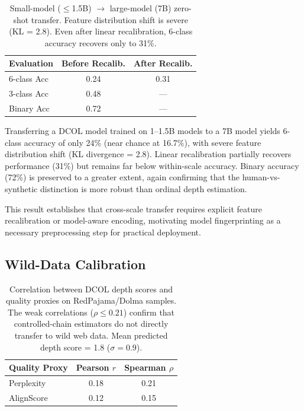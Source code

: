 \documentclass[11pt,a4paper]{article}
\begin{document}
\begin{table}[t]
\centering
\small
\begin{tabular}{lcc}
\toprule
\textbf{Evaluation} & \textbf{Before Recalib.} & \textbf{After Recalib.} \\
\midrule
6-class Acc & 0.24 & 0.31 \\
3-class Acc & 0.48 & --- \\
Binary Acc & 0.72 & --- \\
\bottomrule
\end{tabular}
\caption{Small-model ($\leq$1.5B) $\to$ large-model (7B) zero-shot transfer. Feature distribution shift is severe (KL = 2.8). Even after linear recalibration, 6-class accuracy recovers only to 31\%.}
\label{tab:cross_scale}
\end{table}

Transferring a DCOL model trained on 1--1.5B models to a 7B model yields 6-class accuracy of only 24\% (near chance at 16.7\%), with severe feature distribution shift (KL divergence = 2.8).
Linear recalibration partially recovers performance (31\%) but remains far below within-scale accuracy.
Binary accuracy (72\%) is preserved to a greater extent, again confirming that the human-vs-synthetic distinction is more robust than ordinal depth estimation.

This result establishes that cross-scale transfer requires explicit feature recalibration or model-aware encoding, motivating model fingerprinting as a necessary preprocessing step for practical deployment.

\subsection{Wild-Data Calibration}

\begin{table}[t]
\centering
\small
\begin{tabular}{lcc}
\toprule
\textbf{Quality Proxy} & \textbf{Pearson $r$} & \textbf{Spearman $\rho$} \\
\midrule
Perplexity & 0.18 & 0.21 \\
AlignScore & 0.12 & 0.15 \\
\bottomrule
\end{tabular}
\caption{Correlation between DCOL depth scores and quality proxies on RedPajama/Dolma samples. The weak correlations ($\rho \leq 0.21$) confirm that controlled-chain estimators do not directly transfer to wild web data. Mean predicted depth score = 1.8 ($\sigma = 0.9$).}
\label{tab:wild}
\end{table}
\end{document}
